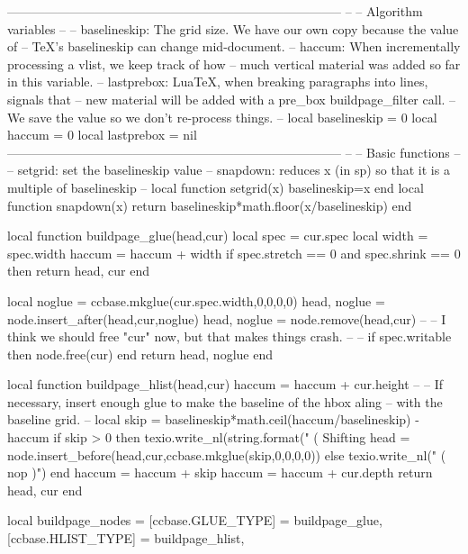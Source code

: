 

\makeatletter
%
%
\luacode
--------------------------------------------------------------------------------
--
-- Algorithm variables
--
-- baselineskip: The grid size. We have our own copy because the value of
--     TeX's baselineskip can change mid-document.
-- haccum: When incrementally processing a vlist, we keep track of how
--     much vertical material was added so far in this variable.
-- lastprebox: LuaTeX, when breaking paragraphs into lines, signals that
--     new material will be added with a pre_box buildpage_filter call.
--     We save the value so we don't re-process things.
--
local baselineskip = 0
local haccum = 0
local lastprebox = nil
--------------------------------------------------------------------------------
--
-- Basic functions
--
-- setgrid: set the baselineskip value
-- snapdown: reduces x (in sp) so that it is a multiple of baselineskip
--
local function setgrid(x) baselineskip=x end
local function snapdown(x) return baselineskip*math.floor(x/baselineskip) end

local function buildpage_glue(head,cur)
  local spec = cur.spec
  local width = spec.width
  haccum = haccum + width
  if spec.stretch == 0 and spec.shrink == 0 then return head, cur end

  local noglue = ccbase.mkglue(cur.spec.width,0,0,0,0)
  head, noglue = node.insert_after(head,cur,noglue)
  head, noglue = node.remove(head,cur)
  --
  -- I think we should free "cur" now, but that makes things crash.
  --
  -- if spec.writable then node.free(cur) end
  return head, noglue
end

local function buildpage_hlist(head,cur)
  haccum = haccum + cur.height
  --
  -- If necessary, insert enough glue to make the baseline of the hbox aling
  -- with the baseline grid.
  --
  local skip = baselineskip*math.ceil(haccum/baselineskip) - haccum
  if skip > 0 then
    texio.write_nl(string.format("  ( Shifting %
    head = node.insert_before(head,cur,ccbase.mkglue(skip,0,0,0,0))
  else
    texio.write_nl("  ( nop )")
  end
  haccum = haccum + skip
  haccum = haccum + cur.depth
  return head, cur
end

local buildpage_nodes = {
  [ccbase.GLUE_TYPE]  = buildpage_glue,
  [ccbase.HLIST_TYPE] = buildpage_hlist,
}

